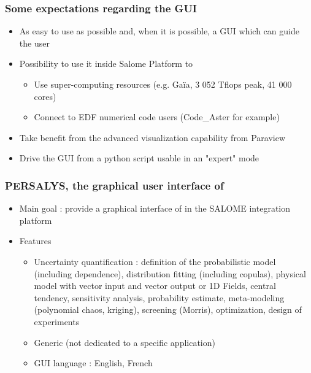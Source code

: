\documentclass[aspectratio=169]{beamer}
\begin{document}

\begin{frame}
  \frametitle{Some expectations regarding the GUI}
  \begin{itemize}
  \item As easy to use as possible and, when it is possible, a GUI which can guide the user

  \item Possibility to use it inside Salome Platform to
    \begin{itemize}
    \item Use super-computing resources (e.g. Gaïa, 3 052 Tflops peak, 41 000 cores)
    \item Connect to EDF numerical code users (Code\_Aster for example)
    \end{itemize}

  \item Take benefit from the advanced visualization capability from Paraview

  \item Drive the GUI from a python script usable in an "expert" mode
  \end{itemize}
\end{frame}


\begin{frame}
  \frametitle{PERSALYS, the graphical user interface of \ot{}}

  \begin{itemize}
  \item Main goal : provide a graphical interface of
    \ot{} in the SALOME integration platform
  \item Features
    \begin{itemize}
    \item Uncertainty quantification : definition of the
      probabilistic model (including dependence), distribution fitting (including
      copulas), physical model with vector input
      and vector output or 1D Fields,
      central tendency, sensitivity analysis, probability estimate,
      meta-modeling (polynomial chaos, kriging), screening (Morris),
      optimization, design of experiments
    \item Generic (not dedicated to a specific application)
    \item GUI language : English, French
    \end{itemize}
  \end{itemize}

\end{frame}
\end{document}
